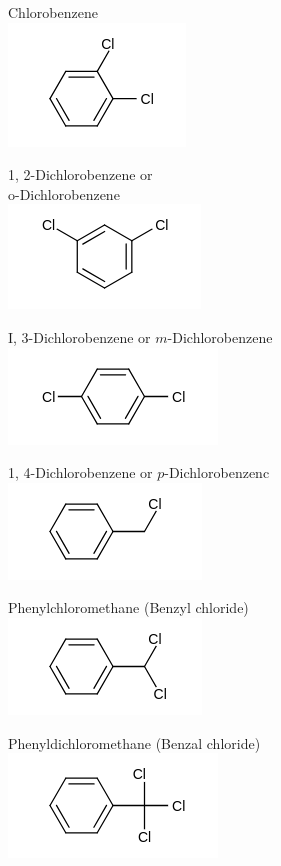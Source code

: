 \documentclass[10pt]{article}
\begin{document}
Chlorobenzene\\
\includegraphics{smile-18a3f9d6ab4e0444f92162a92eeb04dca824d8c7}

1, 2-Dichlorobenzene or\\
o-Dichlorobenzene\\
\includegraphics{smile-f08d81ddca05aece9ffd66d3cc18fe54dabfc84e}

I, 3-Dichlorobenzene or $m$-Dichlorobenzene\\
\includegraphics{smile-837d7e2c2cbcdaf2606f6267a8e1caa549387641}

1, 4-Dichlorobenzene or $p$-Dichlorobenzenc\\
\includegraphics{smile-55832149e2095105a4236da22c3bfa9603a57a2a}

Phenylchloromethane (Benzyl chloride)\\
\includegraphics{smile-c6471a1a081877bd23fce09723f692f65660a8d2}

Phenyldichloromethane (Benzal chloride)\\
\includegraphics{smile-34055b2ffb694a2bd417570abed48180777ff26d}
\end{document}
